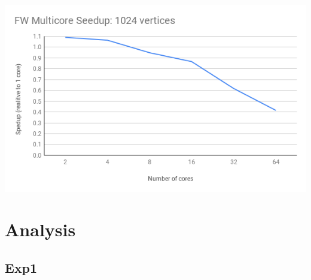 \documentclass[]{article}
\begin{document}
		\includegraphics[scale=0.5]{graphs/exp2_1024.png}\\

\section{Analysis}
	\subsection{Exp1}
	
\end{document}

